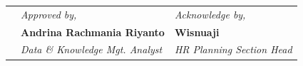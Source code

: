 \documentclass[a4paper,10pt]{article}
\newcommand{\approvedName}{Andrina Rachmania Riyanto}
\newcommand{\approvedTitle}{Data \& Knowledge Mgt. Analyst}
\newcommand{\acknowledgeName}{Wisnuaji}
\newcommand{\acknowledgeTitle}{HR Planning Section Head}
\begin{document}
\vfill

{\fontsize{10.5}{13}\selectfont
	\noindent
	\begin{tabular}{@{}p{0.8cm}@{}p{\dimexpr\textwidth-6.75cm\relax}@{}p{5.95cm}@{}}
		 & \textit{Approved by,}   & \textit{Acknowledge by,}   \\[2.5cm]
		 & \textbf{\approvedName}  & \textbf{\acknowledgeName}  \\
		 & \textit{\approvedTitle} & \textit{\acknowledgeTitle} \\
	\end{tabular}
}
\end{document}
